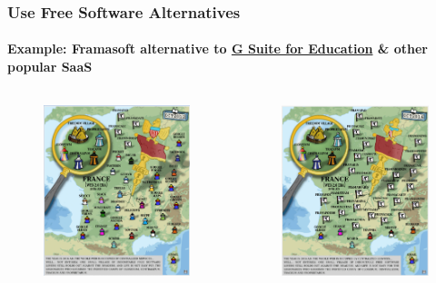 	\begin{frame}
	\frametitle{Use Free Software Alternatives}
	\framesubtitle{Example: Framasoft alternative to \href{https://blog.google/topics/education/introducing-g-suite-education/}{G Suite for Education} \& other popular SaaS}
	\begin{columns}
	        	\begin{figure}[h]
               		\centering
                	\includegraphics[width=.8\textwidth]{../pics/framasoft-gaulle}
        		\end{figure}
	        	\begin{figure}[h]
                	\centering
                	\includegraphics[width=.8\textwidth]{../pics/framasoft-gaulle-201610}
        		\end{figure}
	\end{columns}
	\end{frame}

